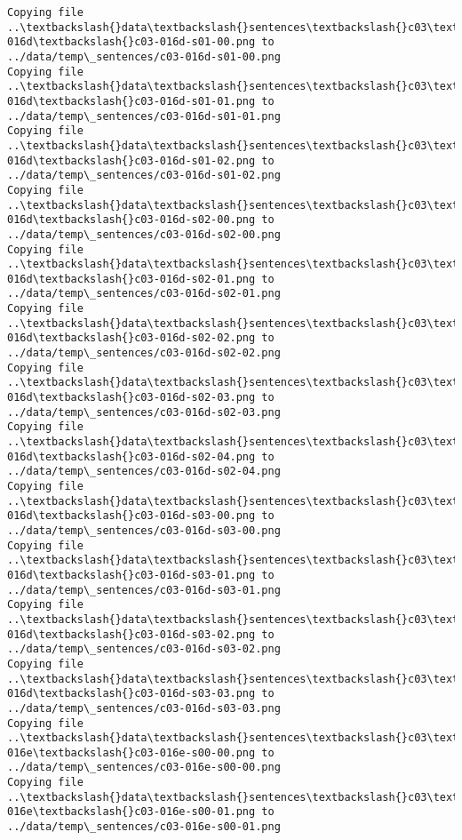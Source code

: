 \documentclass[11pt]{article}
\begin{document}
\begin{Verbatim}[commandchars=\\\{\}]
Copying file ..\textbackslash{}data\textbackslash{}sentences\textbackslash{}c03\textbackslash{}c03-016d\textbackslash{}c03-016d-s01-00.png to
../data/temp\_sentences/c03-016d-s01-00.png
Copying file ..\textbackslash{}data\textbackslash{}sentences\textbackslash{}c03\textbackslash{}c03-016d\textbackslash{}c03-016d-s01-01.png to
../data/temp\_sentences/c03-016d-s01-01.png
Copying file ..\textbackslash{}data\textbackslash{}sentences\textbackslash{}c03\textbackslash{}c03-016d\textbackslash{}c03-016d-s01-02.png to
../data/temp\_sentences/c03-016d-s01-02.png
Copying file ..\textbackslash{}data\textbackslash{}sentences\textbackslash{}c03\textbackslash{}c03-016d\textbackslash{}c03-016d-s02-00.png to
../data/temp\_sentences/c03-016d-s02-00.png
Copying file ..\textbackslash{}data\textbackslash{}sentences\textbackslash{}c03\textbackslash{}c03-016d\textbackslash{}c03-016d-s02-01.png to
../data/temp\_sentences/c03-016d-s02-01.png
Copying file ..\textbackslash{}data\textbackslash{}sentences\textbackslash{}c03\textbackslash{}c03-016d\textbackslash{}c03-016d-s02-02.png to
../data/temp\_sentences/c03-016d-s02-02.png
Copying file ..\textbackslash{}data\textbackslash{}sentences\textbackslash{}c03\textbackslash{}c03-016d\textbackslash{}c03-016d-s02-03.png to
../data/temp\_sentences/c03-016d-s02-03.png
Copying file ..\textbackslash{}data\textbackslash{}sentences\textbackslash{}c03\textbackslash{}c03-016d\textbackslash{}c03-016d-s02-04.png to
../data/temp\_sentences/c03-016d-s02-04.png
Copying file ..\textbackslash{}data\textbackslash{}sentences\textbackslash{}c03\textbackslash{}c03-016d\textbackslash{}c03-016d-s03-00.png to
../data/temp\_sentences/c03-016d-s03-00.png
Copying file ..\textbackslash{}data\textbackslash{}sentences\textbackslash{}c03\textbackslash{}c03-016d\textbackslash{}c03-016d-s03-01.png to
../data/temp\_sentences/c03-016d-s03-01.png
Copying file ..\textbackslash{}data\textbackslash{}sentences\textbackslash{}c03\textbackslash{}c03-016d\textbackslash{}c03-016d-s03-02.png to
../data/temp\_sentences/c03-016d-s03-02.png
Copying file ..\textbackslash{}data\textbackslash{}sentences\textbackslash{}c03\textbackslash{}c03-016d\textbackslash{}c03-016d-s03-03.png to
../data/temp\_sentences/c03-016d-s03-03.png
Copying file ..\textbackslash{}data\textbackslash{}sentences\textbackslash{}c03\textbackslash{}c03-016e\textbackslash{}c03-016e-s00-00.png to
../data/temp\_sentences/c03-016e-s00-00.png
Copying file ..\textbackslash{}data\textbackslash{}sentences\textbackslash{}c03\textbackslash{}c03-016e\textbackslash{}c03-016e-s00-01.png to
../data/temp\_sentences/c03-016e-s00-01.png

\end{Verbatim}
\end{document}
